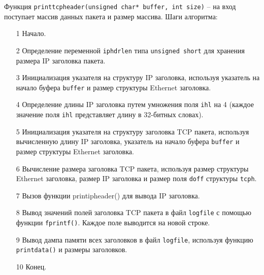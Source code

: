 Функция \texttt{print{\textunderscore}tcp{\textunderscore}header(unsigned char* buffer, int size)} -- на
вход поступает массив данных пакета и размер массива. Шаги алгоритма:
\begin{enumerate}
    \item[1] Начало.
    \item[2] Определение переменной \texttt{iphdrlen} типа \texttt{unsigned short} для хранения
    размера IP заголовка пакета.
    \item[3] Инициализация указателя на структуру IP заголовка, используя
    указатель на начало буфера \texttt{buffer} и размер структуры Ethernet заголовка.
    \item[4] Определение длины IP заголовка путем умножения поля \texttt{ihl} на 4
    (каждое значение поля \texttt{ihl} представляет длину в 32-битных словах).
    \item[5] Инициализация указателя на структуру заголовка TCP пакета, используя
    вычисленную длину IP заголовка, указатель на начало буфера \texttt{buffer} и размер
    структуры Ethernet заголовка.
    \item[6] Вычисление размера заголовка TCP пакета, используя размер структуры
    Ethernet заголовка, размер IP заголовка и размер поля \texttt{doff} структуры \texttt{tcph}.
    \item[7] Вызов функции print{\textunderscore}ip{\textunderscore}header() для вывода IP заголовка.
    \item[8] Вывод значений полей заголовка TCP пакета в файл \texttt{logfile} с помощью
    функции \texttt{fprintf()}\cite{lang_c}. Каждое поле выводится на новой строке.
    \item[9] Вывод дампа памяти всех заголовков в файл \texttt{logfile}, используя
    функцию \texttt{print{\textunderscore}data()} и размеры заголовков.
    \item[10] Конец.
\end{enumerate}